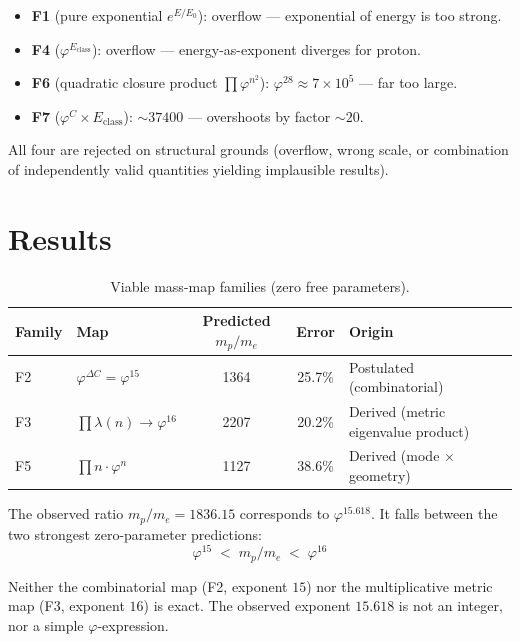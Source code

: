 \documentclass[12pt]{article}
\newcommand{\phig}{\varphi}
\begin{document}
\begin{itemize}
    \item \textbf{F1} (pure exponential $e^{E/E_0}$): overflow --- exponential of energy is too strong.
    \item \textbf{F4} ($\phig^{E_{\mathrm{class}}}$): overflow --- energy-as-exponent diverges for proton.
    \item \textbf{F6} (quadratic closure product $\prod \phig^{n^2}$): $\phig^{28} \approx 7 \times 10^5$ --- far too large.
    \item \textbf{F7} ($\phig^C \times E_{\mathrm{class}}$): $\sim\!37400$ --- overshoots by factor $\sim\!20$.
\end{itemize}

All four are rejected on structural grounds (overflow, wrong scale, or combination of independently valid quantities yielding implausible results).

\section{Results}\label{sec:results}

\begin{table}[ht]
\centering
\caption{Viable mass-map families (zero free parameters).}
\label{tab:results}
\begin{tabular}{@{}llccl@{}}
\toprule
Family & Map & Predicted $m_p/m_e$ & Error & Origin \\
\midrule
F2 & $\phig^{\Delta C} = \phig^{15}$ & 1364 & 25.7\% & Postulated (combinatorial) \\
F3 & $\prod \lambda(n) \to \phig^{16}$ & 2207 & 20.2\% & Derived (metric eigenvalue product) \\
F5 & $\prod n \cdot \phig^n$ & 1127 & 38.6\% & Derived (mode $\times$ geometry) \\
\bottomrule
\end{tabular}
\end{table}

The observed ratio $m_p/m_e = 1836.15$ corresponds to $\phig^{15.618}$. It falls between the two strongest zero-parameter predictions:
\begin{equation}
    \phig^{15} \;<\; m_p/m_e \;<\; \phig^{16}
\end{equation}

Neither the combinatorial map (F2, exponent $15$) nor the multiplicative metric map (F3, exponent $16$) is exact. The observed exponent $15.618$ is not an integer, nor a simple $\phig$-expression.
\end{document}
